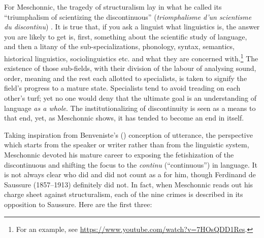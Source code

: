 \documentclass[output=paper]{langscibook}
\begin{document}
\largerpage[-1]For Meschonnic, the tragedy of structuralism lay in what he called its ``triumphalism of scientizing the discontinuous'' (\emph{triomphalisme d’un scientisme du discontinu}) \citep[20]{Meschonnic2009}. It is true that, if you ask a linguist what linguistics is, the answer you are likely to get is, first, something about the scientific study of language, and then a litany of the sub-specializations, phonology, syntax, semantics, historical linguistics, sociolinguistics etc. and what they are concerned with.\footnote{For an example, see \url{https://www.youtube.com/watch?v=7HOsQDD1Res}.} The existence of those sub-fields, with their division of the labour of analysing sound, order, meaning and the rest each allotted to specialists, is taken to signify the field's progress to a mature state. Specialists tend to avoid treading on each other's turf; yet no one would deny that the ultimate goal is an understanding of language \emph{as a whole}. The institutionalizing of discontinuity is seen as a means to that end, yet, as Meschonnic shows, it has tended to become an end in itself.

Taking inspiration from Benveniste's (\citeyear{Benveniste1970appareil}) conception of utterance, the perspective which starts from the speaker or writer rather than from the linguistic system, Meschonnic devoted his mature career to exposing the  fetishization of the discontinuous and shifting the focus to the \emph{continu} (``continuous'') in language. It is not always clear who did and did not count as a  for him, though Ferdinand de Saussure (1857--1913) definitely did not. In fact, when Meschonnic reads out his charge sheet against structuralism, each of the nine crimes is described in its opposition to Saussure. Here are the first three:
\end{document}

